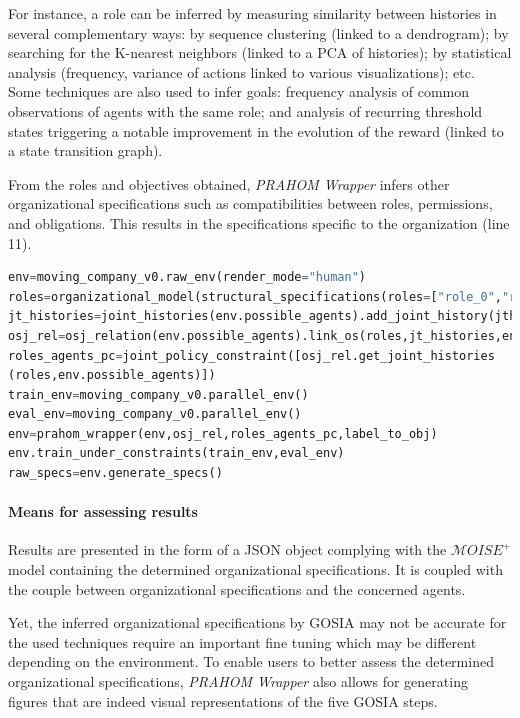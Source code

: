 \documentclass[doubleblind]{ecai}
\newcounter{relation}
\begin{document}
For instance, a role can be inferred by measuring similarity between histories in several complementary ways: by sequence clustering (linked to a dendrogram); by searching for the K-nearest neighbors (linked to a PCA of histories); by statistical analysis (frequency, variance of actions linked to various visualizations); etc.
Some techniques are also used to infer goals: frequency analysis of common observations of agents with the same role; and analysis of recurring threshold states triggering a notable improvement in the evolution of the reward (linked to a state transition graph).

From the roles and objectives obtained, \emph{PRAHOM Wrapper} infers other organizational specifications such as compatibilities between roles, permissions, and obligations. This results in the specifications specific to the organization (line 11).


\begin{lstlisting}[language=Python, caption={View of \emph{PRAHOM Wrapper} use for \emph{Moving Company}}, label={lst:wrapper_mc}]
env=moving_company_v0.raw_env(render_mode="human")
roles=organizational_model(structural_specifications(roles=["role_0","role_1""role2"],...)
jt_histories=joint_histories(env.possible_agents).add_joint_history(jth)
osj_rel=osj_relation(env.possible_agents).link_os(roles,jt_histories,env.possible_agents)
roles_agents_pc=joint_policy_constraint([osj_rel.get_joint_histories
(roles,env.possible_agents)])
train_env=moving_company_v0.parallel_env()
eval_env=moving_company_v0.parallel_env()
env=prahom_wrapper(env,osj_rel,roles_agents_pc,label_to_obj)
env.train_under_constraints(train_env,eval_env)
raw_specs=env.generate_specs()
\end{lstlisting}

\paragraph{Means for assessing results}

Results are presented in the form of a JSON object complying with the $\mathcal{M}OISE^+$ model containing the determined organizational specifications. It is coupled with the couple between organizational specifications and the concerned agents.

Yet, the inferred organizational specifications by GOSIA may not be accurate for the used techniques require an important fine tuning which may be different depending on the environment. To enable users to better assess the determined organizational specifications, \emph{PRAHOM Wrapper} also allows for generating figures that are indeed visual representations of the five GOSIA steps.
\end{document}
